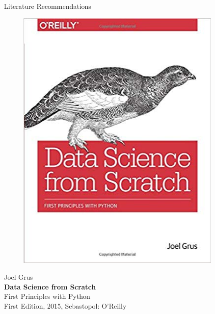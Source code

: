 \documentclass[document.tex]{subfiles}
\begin{document}
\begin{frame}{Literature Recommendations}
        \begin{minipage}{0.1\textwidth}
            \begin{figure}[H]
                \includegraphics[height=0.2\textheight, width=0.9\textwidth, left]{assets/book-covers/grus2015.jpg}
            \end{figure}
        \end{minipage}
        \begin{minipage}{0.32\textwidth}
            \footnotesize Joel Grus \normalsize \\[-0.5mm]
            \small \textbf{Data Science from Scratch} \\[-0.8mm]
            First Principles with Python \normalsize \\
            \tiny First Edition, 2015, Sebastopol: O'Reilly \normalsize
        \end{minipage}
        \begin{minipage}{0.1\textwidth}
            \begin{figure}[H]

\end{figure}
\end{minipage}
\end{frame}
\end{document}
